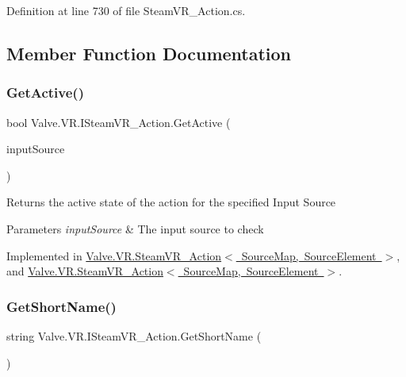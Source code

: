 Definition at line 730 of file Steam\+V\+R\+\_\+\+Action.\+cs.



\subsection{Member Function Documentation}
\mbox{\label{interface_valve_1_1_v_r_1_1_i_steam_v_r___action_ad8d90df47697c9e5b43a0a46a241aa85}} 
\subsubsection{\texorpdfstring{GetActive()}{GetActive()}}
{\footnotesize\ttfamily bool Valve.\+V\+R.\+I\+Steam\+V\+R\+\_\+\+Action.\+Get\+Active (\begin{DoxyParamCaption}\item[{\mbox{\hyperlink{namespace_valve_1_1_v_r_a82e5bf501cc3aa155444ee3f0662853f}{Steam\+V\+R\+\_\+\+Input\+\_\+\+Sources}}}]{input\+Source }\end{DoxyParamCaption})}



Returns the active state of the action for the specified Input Source 


\begin{DoxyParams}{Parameters}
{\em input\+Source} & The input source to check\\
\hline
\end{DoxyParams}


Implemented in \mbox{\hyperlink{class_valve_1_1_v_r_1_1_steam_v_r___action_a22690e2467a2d5b78b495f7fcdd5666b}{Valve.\+V\+R.\+Steam\+V\+R\+\_\+\+Action$<$ Source\+Map, Source\+Element $>$}}, and \mbox{\hyperlink{class_valve_1_1_v_r_1_1_steam_v_r___action_a76c9b93e06e87e5fa861423bd4102c4c}{Valve.\+V\+R.\+Steam\+V\+R\+\_\+\+Action$<$ Source\+Map, Source\+Element $>$}}.

\mbox{\label{interface_valve_1_1_v_r_1_1_i_steam_v_r___action_ae21f01096754a807c68543f61e63bf1c}} 
\subsubsection{\texorpdfstring{GetShortName()}{GetShortName()}}
{\footnotesize\ttfamily string Valve.\+V\+R.\+I\+Steam\+V\+R\+\_\+\+Action.\+Get\+Short\+Name (\begin{DoxyParamCaption}{ }\end{DoxyParamCaption})}



